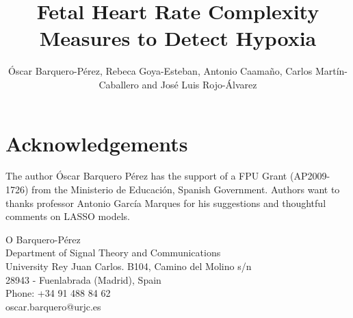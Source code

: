 \documentclass[twocolumn]{cinc}
\begin{document}


\title{Fetal Heart Rate Complexity Measures to Detect Hypoxia}
\author{\'Oscar Barquero-P\'erez, Rebeca Goya-Esteban, Antonio Caama\~no, Carlos Mart\'in-Caballero and Jos\'e Luis Rojo-\'Alvarez}

\maketitle





%

% 



\section*{Acknowledgements}
The author \'Oscar Barquero P\'erez has the support of a FPU Grant (AP2009-1726) from the Ministerio de Educaci\'on, Spanish Government. Authors want to thanks professor Antonio Garc\'ia Marques for his suggestions and thoughtful comments on LASSO models.

\begin{correspondence}
O Barquero-P\'erez\\
Department of Signal Theory and Communications\\
University Rey Juan Carlos. B104, Camino del Molino s/n\\
28943 - Fuenlabrada (Madrid), Spain\\
Phone: +34 91 488 84 62\\
oscar.barquero@urjc.es
 \end{correspondence}
\end{document}

